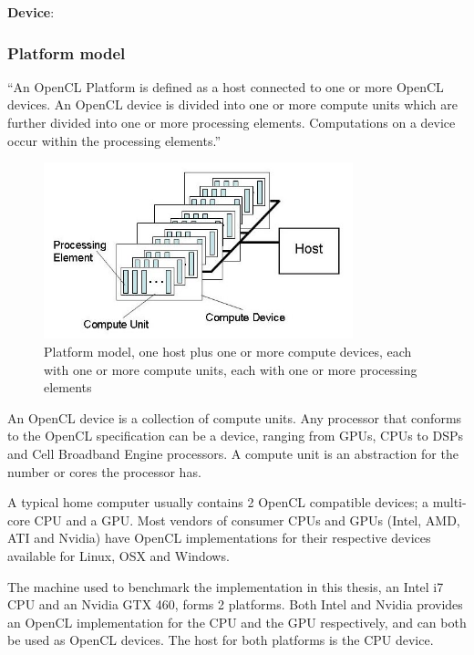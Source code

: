 \vspace{5mm} \textbf{Device}:


\subsubsection{Platform model}

``An OpenCL Platform is defined as a host connected to one or more
OpenCL devices. An OpenCL device is divided into one or more compute
units which are further divided into one or more processing elements.
Computations on a device occur within the processing elements.''
\cite{cl-spec}

\begin{figure}
  \centering
  \includegraphics[width=0.8\textwidth]{images/platform-model.png}
  \caption{Platform model, one host plus one or more compute devices,
    each with one or more compute units, each with one or more
    processing elements}
  \label{platform-model-figure}
\end{figure}

An OpenCL device is a collection of compute units. Any processor that
conforms to the OpenCL specification can be a device, ranging from
GPUs, CPUs to DSPs and Cell Broadband Engine processors. A compute
unit is an abstraction for the number or cores the processor has.

A typical home computer usually contains 2 OpenCL compatible devices;
a multi-core CPU and a GPU. Most vendors of consumer CPUs and GPUs
(Intel, AMD, ATI and Nvidia) have OpenCL implementations for their
respective devices available for Linux, OSX and Windows.

The machine used to benchmark the implementation in this thesis, an
Intel i7 CPU and an Nvidia GTX 460, forms 2 platforms. Both Intel and
Nvidia provides an OpenCL implementation for the CPU and the GPU
respectively, and can both be used as OpenCL devices. The host for
both platforms is the CPU device.

